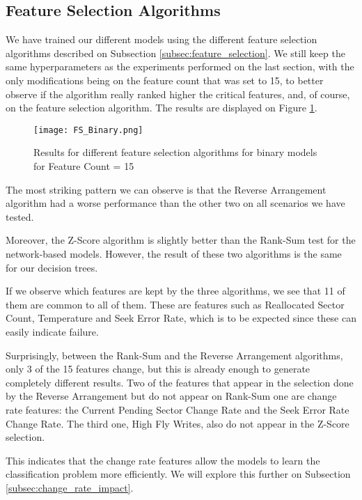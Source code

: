 \subsection{Feature Selection Algorithms}

We have trained our different models using the different feature selection algorithms described on Subsection \ref{subsec:feature_selection}.
We still keep the same hyperparameters as the experiments performed on the last section, with the only modifications being on the feature count that was set to 15, to better observe if the algorithm really ranked higher the critical features,  and, of course, on the feature selection algorithm.
The results are displayed on Figure \ref{fig:fs_binary}.

\begin{figure}
\begin{center}
  \texttt{[image: FS\_Binary.png]}
  \caption[Feature Selection Results]{Results for different feature selection algorithms for binary models for Feature Count = 15}
  \label{fig:fs_binary}
\end{center}
\end{figure}

The most striking pattern we can observe is that the Reverse Arrangement algorithm had a worse performance than the other two on all scenarios we have tested.

Moreover, the Z-Score algorithm is slightly better than the Rank-Sum test for the network-based models.
However, the result of these two algorithms is the same for our decision trees.

If we observe which features are kept by the three algorithms, we see that 11 of them are common to all of them.
These are features such as Reallocated Sector Count, Temperature and Seek Error Rate, which is to be expected since these can easily indicate failure.

Surprisingly, between the Rank-Sum and the Reverse Arrangement algorithms, only 3 of the 15 features change, but this is already enough to generate completely different results.
Two of the features that appear in the selection done by the Reverse Arrangement but do not appear on Rank-Sum one are change rate features: the Current Pending Sector Change Rate and the Seek Error Rate Change Rate.
The third one, High Fly Writes, also do not appear in the Z-Score selection.

This indicates that the change rate features allow the models to learn the classification problem more efficiently.
We will explore this further on Subsection \ref{subsec:change_rate_impact}.

